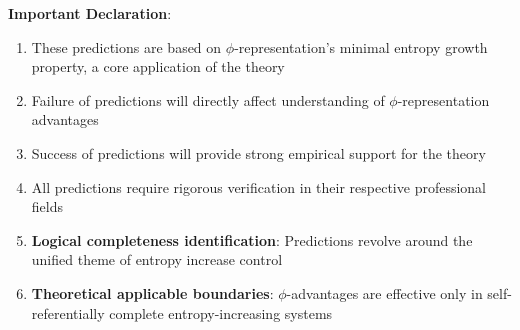 \textbf{Important Declaration}:

\begin{enumerate}
\item These predictions are based on $\phi$-representation's minimal entropy growth property, a core application of the theory
\item Failure of predictions will directly affect understanding of $\phi$-representation advantages
\item Success of predictions will provide strong empirical support for the theory
\item All predictions require rigorous verification in their respective professional fields
\item \textbf{Logical completeness identification}: Predictions revolve around the unified theme of entropy increase control
\item \textbf{Theoretical applicable boundaries}: $\phi$-advantages are effective only in self-referentially complete entropy-increasing systems
\end{enumerate}

